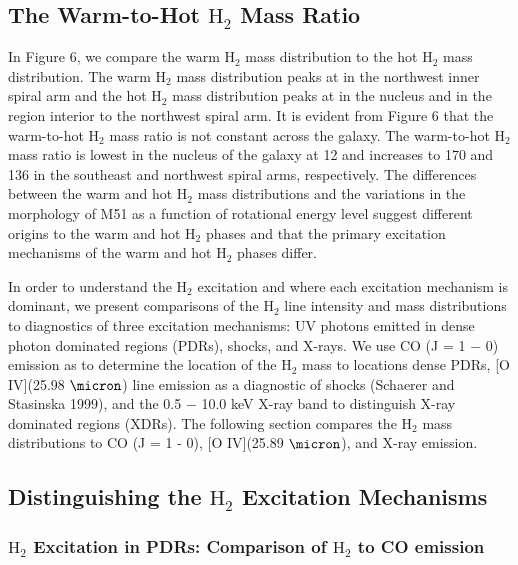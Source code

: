 \documentclass[manuscript]{aastex}
\begin{document}

\subsection{The Warm-to-Hot $\mathrm{H_2}$ Mass Ratio}

In Figure 6, we compare the warm $\mathrm{H_2}$ mass distribution to the hot $\mathrm{H_2}$ mass distribution.  The warm $\mathrm{H_2}$ mass distribution peaks at 
in the northwest inner spiral arm and the hot $\mathrm{H_2}$ mass distribution peaks at
in the nucleus and in the region interior to the northwest spiral arm.  It is evident from Figure 6 that the warm-to-hot $\mathrm{H_2}$ mass ratio is not constant across the galaxy.  The warm-to-hot $\mathrm{H_2}$ mass ratio is lowest in the nucleus of the galaxy at 12 and increases to 170 and 136 in the southeast and northwest spiral arms, respectively.  The differences between the warm and hot $\mathrm{H_2}$ mass distributions and the variations in the morphology of M51 as a  function of rotational energy level suggest different origins to the warm and hot $\mathrm{H_2}$ phases and that the primary excitation mechanisms of the warm and hot $\mathrm{H_2}$ phases differ.  
 
In order to understand the $\mathrm{H_2}$ excitation and where each excitation mechanism is dominant, we present comparisons of the $\mathrm{H_2}$ line intensity and mass distributions to diagnostics of three excitation mechanisms: UV photons emitted in dense photon dominated regions (PDRs), shocks, and X-rays.  We use CO (J = 1 $-$ 0) emission as to determine the location of the $\mathrm{H_2}$ mass to locations dense PDRs, [O IV](25.98 $\micron$) line emission as a diagnostic of shocks (Schaerer and Stasinska 1999), and the 0.5 $-$ 10.0 keV X-ray band to distinguish X-ray dominated regions (XDRs).  The following section compares the $\mathrm{H_2}$ mass distributions to CO (J = 1 - 0), [O IV](25.89 $\micron$), and X-ray emission.

\subsection{Distinguishing the $\mathrm{H_2}$ Excitation Mechanisms}

\subsubsection{$\mathrm{H_2}$ Excitation in PDRs: Comparison of $\mathrm{H_2}$ to CO emission}
\end{document}
